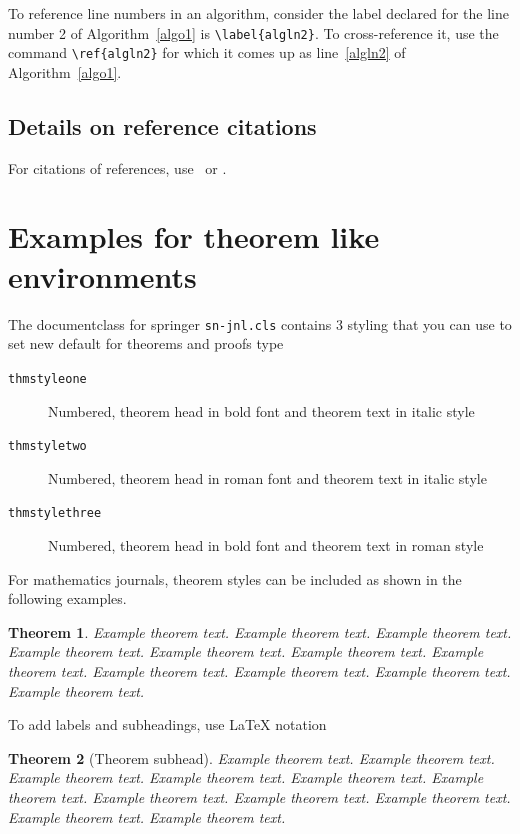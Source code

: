 \documentclass[sn-basic,pdflatex]{sn-jnl}
\newtheorem{theorem}{Theorem}%
\theoremstyle{remark}
\theoremstyle{definition}
\begin{document}
To reference line numbers in an algorithm, consider the label declared
for the line number 2 of Algorithm~\ref{algo1} is
\texttt{\textbackslash{}label\{algln2\}}. To cross-reference it, use the
command \texttt{\textbackslash{}ref\{algln2\}} for which it comes up as
line~\ref{algln2} of Algorithm~\ref{algo1}.

\subsection{Details on reference citations}\label{subsec7}

For citations of references, use~\citet{bib1} or \citep{bib2}.

\section{Examples for theorem like environments}\label{sec10}

The documentclass for springer \texttt{sn-jnl.cls} contains 3 styling
that you can use to set new default for theorems and proofs type

\begin{description}
\item[\texttt{thmstyleone}]
Numbered, theorem head in bold font and theorem text in italic style
\item[\texttt{thmstyletwo}]
Numbered, theorem head in roman font and theorem text in italic style
\item[\texttt{thmstylethree}]
Numbered, theorem head in bold font and theorem text in roman style
\end{description}

For mathematics journals, theorem styles can be included as shown in the
following examples.

\begin{theorem}
Example theorem text. Example theorem text. Example theorem text.
Example theorem text. Example theorem text. Example theorem text.
Example theorem text. Example theorem text. Example theorem text.
Example theorem text. Example theorem text.

\end{theorem}

To add labels and subheadings, use LaTeX notation

\begin{theorem}[Theorem subhead]\label{thm1}
Example theorem text. Example theorem text. Example theorem text.
Example theorem text. Example theorem text. Example theorem text.
Example theorem text. Example theorem text. Example theorem text.
Example theorem text. Example theorem text.

\end{theorem}
\end{document}
